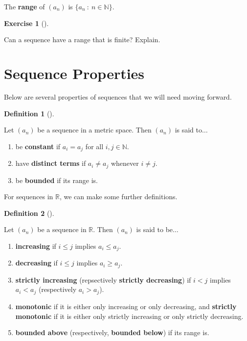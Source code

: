 \documentclass[
  letterpaper,
  DIV=11,
  numbers=noendperiod]{scrreprt}
\providecommand{\tightlist}{%
  \setlength{\itemsep}{0pt}\setlength{\parskip}{0pt}}
\def\R{\mathbb R}
\def\N{\mathbb N}
\newcommand{\st}{~:~}
\theoremstyle{plain}
\theoremstyle{definition}
\newtheorem{exercise}{Exercise}[chapter]
\theoremstyle{plain}
\theoremstyle{plain}
\theoremstyle{definition}
\theoremstyle{definition}
\newtheorem{definition}{Definition}[chapter]
\theoremstyle{remark}
\begin{document}
The \textbf{range} of \((a_n)\) is \(\{a_n\st n\in\N\}\).

\begin{exercise}[]\protect\hypertarget{exr-finite-range}{}\label{exr-finite-range}

Can a sequence have a range that is finite? Explain.

\end{exercise}

\section{Sequence Properties}\label{sequence-properties}

Below are several properties of sequences that we will need moving
forward.

\begin{definition}[]\protect\hypertarget{def-sequence-props-any-codomain}{}\label{def-sequence-props-any-codomain}

Let \((a_n)\) be a sequence in a metric space. Then \((a_n)\) is said
to\(\ldots\)

\begin{enumerate}
\def\labelenumi{\arabic{enumi}.}
\tightlist
\item
  be \textbf{constant} if \(a_i=a_j\) for all \(i,j\in\N\).
\item
  have \textbf{distinct terms} if \(a_i\neq a_j\) whenever \(i\neq j\).
\item
  be \textbf{bounded} if its range is.
\end{enumerate}

\end{definition}

For sequences in \(\R\), we can make some further definitions.

\begin{definition}[]\protect\hypertarget{def-sequence-props-any-codomain}{}\label{def-sequence-props-any-codomain}

Let \((a_n)\) be a sequence in \(\R\). Then \((a_n)\) is said to
be\(\ldots\)

\begin{enumerate}
\def\labelenumi{\arabic{enumi}.}
\tightlist
\item
  \textbf{increasing} if \(i\leq j\) implies \(a_i\leq a_j\).
\item
  \textbf{decreasing} if \(i\leq j\) implies \(a_i\geq a_j\).
\item
  \textbf{strictly increasing} (repsectively \textbf{strictly
  decreasing}) if \(i< j\) implies \(a_i< a_j\) (respectively
  \(a_i>a_j\)).
\item
  \textbf{monotonic} if it is either only increasing or only decreasing,
  and \textbf{strictly monotonic} if it is either only strictly
  increasing or only strictly decreasing.
\item
  \textbf{bounded above} (respectively, \textbf{bounded below}) if its
  range is.
\end{enumerate}

\end{definition}
\end{document}
